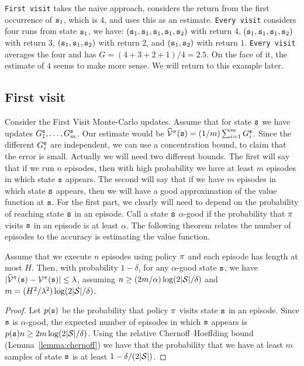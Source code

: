 {\tt First visit} takes the naive approach, considers the return from
the first occurrence of ${\tt s}_1$, which is $4$, and uses this as
an estimate. {\tt Every visit} considers four runs from state
${\tt s}_1$, we have:
$({\tt s}_1,{\tt s}_1,{\tt s}_1,{\tt s}_1,{\tt s}_2)$ with return $4$,
$({\tt s}_1,{\tt s}_1,{\tt s}_1,{\tt s}_2)$ with return $3$,
$({\tt s}_1,{\tt s}_1,{\tt s}_2)$ with return $2$, and
$({\tt s}_1,{\tt s}_2)$ with return $1$. {\tt Every visit} averages
the four and has $G=(4+3+2+1)/4=2.5$. On the face of it, the
estimate of $4$ seems to make more sense. 
We will return to this example later.
\begin{advanced}


\subsection{First visit}

Consider the First Visit Monte-Carlo updates. Assume that for state
${\tt s}$ we have updates $G_1^{\tt s}, \ldots , G^{\tt s}_m$. Our
estimate would be
$\widehat{\mathcal{V}}^\pi({\tt s})=(1/m)\sum_{i=1}^m G^{\tt s}_i$.
Since the different $G^{\tt s}_i$ are independent, we can use a
concentration bound, to claim that the error is small. Actually we
will need two different bounds. The first will say that if we run
$n$ episodes, then with high probability we have at least $m$
episodes in which state ${\tt s}$ appears. The second will say that if
we have $m$ episodes in which state ${\tt s}$ appears, then we will
have a good approximation of the value function at ${\tt s}$. For the first part,
we clearly will need to depend on the probability of reaching state
${\tt s}$ in an episode. Call a state ${\tt s}$ $\alpha$-good if
the probability that $\pi$ visits ${\tt s}$ in an episode is at
least $\alpha$.
The following theorem relates the number of episodes to the accuracy
is estimating the value function.

\begin{theorem}
Assume that we execute $n$ episodes using policy $\pi$ and each
episode has length at most $H$. Then, with probability $1-\delta$,
for any $\alpha$-good state ${\tt s}$, we have
$|\widehat{\mathcal{V}}^\pi({\tt s})-\mathcal{V}^\pi({\tt s})|\leq
\lambda$, assuming $n\geq (2m/\alpha)\log(2|\mathcal{S}|/\delta)$ and
$m=(H^2/\lambda^2)\log(2|\mathcal{S}|/\delta)$.
\end{theorem}

\begin{proof}
Let $p({\tt s})$ be the probability that policy $\pi$ visits
state ${\tt s}$ in an episode. Since ${\tt s}$ is $\alpha$-good, the
expected number of episodes in which ${\tt s}$ appears is
$p({\tt s})n\geq 2m\log(2|\mathcal{S}|/\delta)$. Using the relative
Chernoff--Hoeffding bound (Lemma~\ref{lemma:chernoff}) we have that
the probability that we have at least $m$ samples of state ${\tt s}$
is at least $1-\delta/(2|\mathcal{S}|)$.


\end{proof}
\end{advanced}
